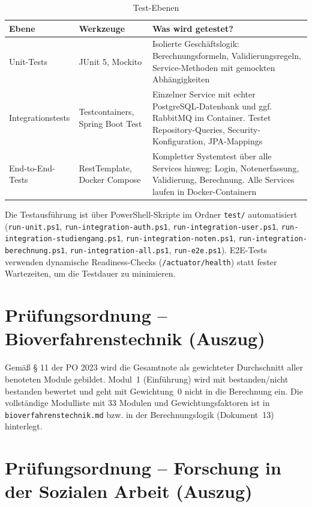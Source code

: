 \documentclass[12pt,a4paper,ngerman]{article}
\begin{document}
\begin{table}[H]
\centering
\caption{Test-Ebenen}
\begin{tabular}{lL{4cm}L{6cm}}
\toprule
\textbf{Ebene} & \textbf{Werkzeuge} & \textbf{Was wird getestet?} \\
\midrule
Unit-Tests       & JUnit 5, Mockito     & Isolierte Geschäftslogik: Berechnungsformeln, Validierungsregeln, Service-Methoden mit gemockten Abhängigkeiten \\
Integrationstests & Testcontainers, Spring Boot Test & Einzelner Service mit echter PostgreSQL-Datenbank und ggf. RabbitMQ im Container. Testet Repository-Queries, Security-Konfiguration, JPA-Mappings \\
End-to-End-Tests & RestTemplate, Docker Compose & Kompletter Systemtest über alle Services hinweg: Login, Notenerfassung, Validierung, Berechnung. Alle Services laufen in Docker-Containern \\
\bottomrule
\end{tabular}
\end{table}

Die Testausführung ist über PowerShell-Skripte im Ordner \texttt{test/} automatisiert (\texttt{run-unit.ps1}, \texttt{run-integration-auth.ps1}, \texttt{run-integration-user.ps1}, \texttt{run-integration-studiengang.ps1}, \texttt{run-integration-noten.ps1}, \texttt{run-integration-berechnung.ps1}, \texttt{run-integration-all.ps1}, \texttt{run-e2e.ps1}). E2E-Tests verwenden dynamische Readiness-Checks (\texttt{/actuator/health}) statt fester Wartezeiten, um die Testdauer zu minimieren.

\appendix

\section{Prüfungsordnung -- Bioverfahrenstechnik (Auszug)}

Gemäß § 11 der PO 2023 wird die Gesamtnote als gewichteter Durchschnitt aller benoteten Module gebildet. Modul~1 (Einführung) wird mit \glqq bestanden/nicht bestanden\grqq{} bewertet und geht mit Gewichtung~0 nicht in die Berechnung ein. Die vollständige Modulliste mit 33 Modulen und Gewichtungsfaktoren ist in \texttt{bioverfahrenstechnik.md} bzw. in der Berechnungslogik (Dokument~13) hinterlegt.

\section{Prüfungsordnung -- Forschung in der Sozialen Arbeit (Auszug)}
\end{document}
